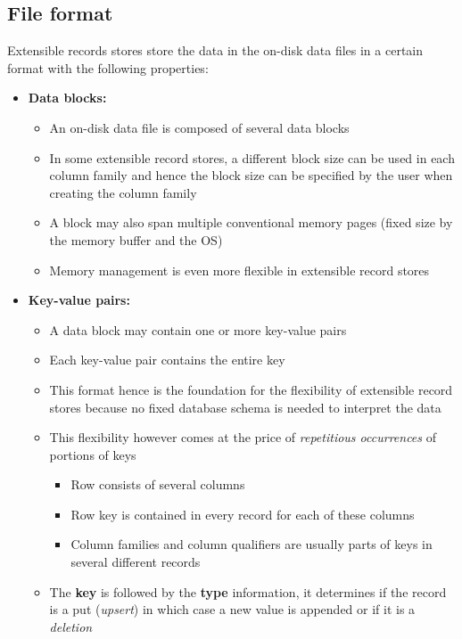 \subsection{File format}
Extensible records stores store the data in the on-disk data files in a certain format with the following properties:
\begin{itemize}
    \item \textbf{Data blocks:}
    \begin{itemize}
        \item An on-disk data file is composed of several data blocks
        \item In some extensible record stores, a different block size can be used in each column family and hence the block size can be specified by the user when creating the column family
        \item A block may also span multiple conventional memory pages (fixed size by the memory buffer and the OS)
        \item Memory management is even more flexible in extensible record stores
    \end{itemize}
    \item \textbf{Key-value pairs:}
    \begin{itemize}
        \item A data block may contain one or more key-value pairs
        \item Each key-value pair contains the entire key
        \item This format hence is the foundation for the flexibility of extensible record stores because no fixed database schema is needed to interpret the data
        \item This flexibility however comes at the price of \textit{repetitious occurrences} of portions of keys
        \begin{itemize}
            \item Row consists of several columns
            \item Row key is contained in every record for each of these columns
            \item Column families and column qualifiers are usually parts of keys in several different records
        \end{itemize}
        \item The \textbf{key} is followed by the \textbf{type} information, it determines if the record is a put (\textit{upsert}) in which case a new value is appended or if it is a \textit{deletion}
    \end{itemize}

\end{itemize}
